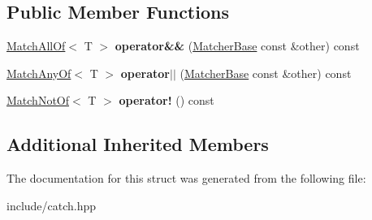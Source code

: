\subsection*{Public Member Functions}
\begin{DoxyCompactItemize}
\item 
\hyperlink{structCatch_1_1Matchers_1_1Impl_1_1MatchAllOf}{Match\+All\+Of}$<$ T $>$ {\bfseries operator\&\&} (\hyperlink{structCatch_1_1Matchers_1_1Impl_1_1MatcherBase}{Matcher\+Base} const \&other) const \hypertarget{structCatch_1_1Matchers_1_1Impl_1_1MatcherBase_a275a18e3e1c4d0bddfde34e362f66b6c}{}\label{structCatch_1_1Matchers_1_1Impl_1_1MatcherBase_a275a18e3e1c4d0bddfde34e362f66b6c}

\item 
\hyperlink{structCatch_1_1Matchers_1_1Impl_1_1MatchAnyOf}{Match\+Any\+Of}$<$ T $>$ {\bfseries operator$\vert$$\vert$} (\hyperlink{structCatch_1_1Matchers_1_1Impl_1_1MatcherBase}{Matcher\+Base} const \&other) const \hypertarget{structCatch_1_1Matchers_1_1Impl_1_1MatcherBase_a382ffd0d07d6a5cdadd2bd36ade0a742}{}\label{structCatch_1_1Matchers_1_1Impl_1_1MatcherBase_a382ffd0d07d6a5cdadd2bd36ade0a742}

\item 
\hyperlink{structCatch_1_1Matchers_1_1Impl_1_1MatchNotOf}{Match\+Not\+Of}$<$ T $>$ {\bfseries operator!} () const \hypertarget{structCatch_1_1Matchers_1_1Impl_1_1MatcherBase_afd5c25339eab93d9ea037fa4282fca7c}{}\label{structCatch_1_1Matchers_1_1Impl_1_1MatcherBase_afd5c25339eab93d9ea037fa4282fca7c}

\end{DoxyCompactItemize}
\subsection*{Additional Inherited Members}


The documentation for this struct was generated from the following file\+:\begin{DoxyCompactItemize}
\item 
include/catch.\+hpp\end{DoxyCompactItemize}

